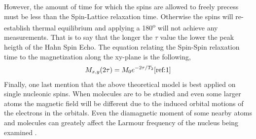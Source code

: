 \documentclass{article}
\begin{document}
{\begin{multicols}{2}
\label{fig:5}
\justify
However, the amount of time for which the spins are allowed to freely precess 
must be less than the Spin-Lattice relaxation time. Otherwise the spins will 
re-establish thermal equilibrium and applying a 180\textsuperscript{o} will not 
achieve any measurements. That is to say that the longer the $\tau$ value the 
lower the peak heigth of the Hahn Spin Echo. The equation relating the 
Spin-Spin relaxation time to the magnetization along the xy-plane is the 
following,
\begin{equation}
M_{x,y}(2\tau) = M_0 e^{-2\tau / T_2}
\cite{ref:1}
\label{eqn:13}
\end{equation}
Finally, one last mention that the above theoretical model is best applied on 
single nucleonic spins. When molecules are to be studied and even some larger 
atoms the magnetic field will be different due to the induced orbital motions 
of the electrons in the orbitals. 
Even the diamagnetic moment of some nearby atoms and molecules can greately 
affect the Larmour frequency of the nucleus being examined \cite{ref:1}.

\end{multicols}}
\end{document}
